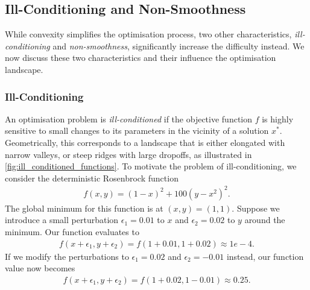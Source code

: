 \subsection{Ill-Conditioning and Non-Smoothness}
\label{ssec:ill_conditioning_nonsmooth}

While convexity simplifies the optimisation process, two other characteristics, \textit{ill-conditioning} and \textit{non-smoothness}, significantly increase the difficulty instead. We now discuss these two characteristics and their influence the optimisation landscape.


\subsubsection{Ill-Conditioning}
\label{sssec:ill_conditioning}

An optimisation problem is \textit{ill-conditioned} if the objective function $f$ is highly sensitive to small changes to its parameters in the vicinity of a solution $x^*$. Geometrically, this corresponds to a landscape that is either elongated with narrow valleys, or steep ridges with large dropoffs, as illustrated in \cref{fig:ill_conditioned_functions}. To motivate the problem of ill-conditioning, we consider the deterministic Rosenbrock function
\begin{align}
    f(x,y) = (1 - x)^2 + 100(y - x^2)^2.
    \label{eq:rosenbrock_function}
\end{align}
The global minimum for this function is at $(x,y) = (1,1)$. Suppose we introduce a small perturbation $\epsilon_1 = 0.01$ to $x$ and $\epsilon_2 = 0.02$ to $y$ around the minimum. Our function evaluates to
\begin{align}
    f(x + \epsilon_1, y + \epsilon_2) = f(1 + 0.01, 1 + 0.02)
    \approx 1e-4.
\end{align}
If we modify the perturbations to $\epsilon_1 = 0.02$ and $\epsilon_2 = -0.01$ instead, our function value now becomes
\begin{align}
    f(x + \epsilon_1, y + \epsilon_2) = f(1 + 0.02, 1 - 0.01)
    \approx 0.25.
\end{align}

